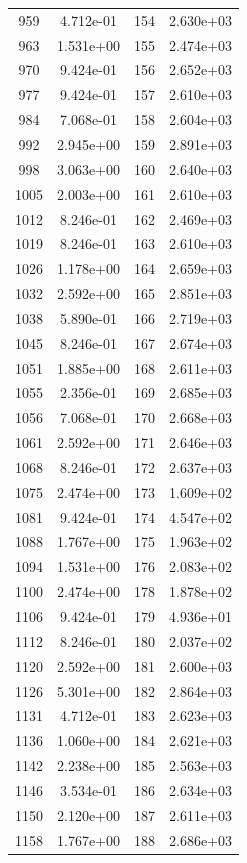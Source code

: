 \documentclass[12pt]{article}
\begin{document}
\begin{longtable}{@{}cccc@{}}
959 & 4.712e-01 & 154 & 2.630e+03 \\
963 & 1.531e+00 & 155 & 2.474e+03 \\
970 & 9.424e-01 & 156 & 2.652e+03 \\
977 & 9.424e-01 & 157 & 2.610e+03 \\
984 & 7.068e-01 & 158 & 2.604e+03 \\
992 & 2.945e+00 & 159 & 2.891e+03 \\
998 & 3.063e+00 & 160 & 2.640e+03 \\
1005 & 2.003e+00 & 161 & 2.610e+03 \\
1012 & 8.246e-01 & 162 & 2.469e+03 \\
1019 & 8.246e-01 & 163 & 2.610e+03 \\
1026 & 1.178e+00 & 164 & 2.659e+03 \\
1032 & 2.592e+00 & 165 & 2.851e+03 \\
1038 & 5.890e-01 & 166 & 2.719e+03 \\
1045 & 8.246e-01 & 167 & 2.674e+03 \\
1051 & 1.885e+00 & 168 & 2.611e+03 \\
1055 & 2.356e-01 & 169 & 2.685e+03 \\
1056 & 7.068e-01 & 170 & 2.668e+03 \\
1061 & 2.592e+00 & 171 & 2.646e+03 \\
1068 & 8.246e-01 & 172 & 2.637e+03 \\
1075 & 2.474e+00 & 173 & 1.609e+02 \\
1081 & 9.424e-01 & 174 & 4.547e+02 \\
1088 & 1.767e+00 & 175 & 1.963e+02 \\
1094 & 1.531e+00 & 176 & 2.083e+02 \\
1100 & 2.474e+00 & 178 & 1.878e+02 \\
1106 & 9.424e-01 & 179 & 4.936e+01 \\
1112 & 8.246e-01 & 180 & 2.037e+02 \\
1120 & 2.592e+00 & 181 & 2.600e+03 \\
1126 & 5.301e+00 & 182 & 2.864e+03 \\
1131 & 4.712e-01 & 183 & 2.623e+03 \\
1136 & 1.060e+00 & 184 & 2.621e+03 \\
1142 & 2.238e+00 & 185 & 2.563e+03 \\
1146 & 3.534e-01 & 186 & 2.634e+03 \\
1150 & 2.120e+00 & 187 & 2.611e+03 \\
1158 & 1.767e+00 & 188 & 2.686e+03 \\

\end{longtable}
\end{document}
